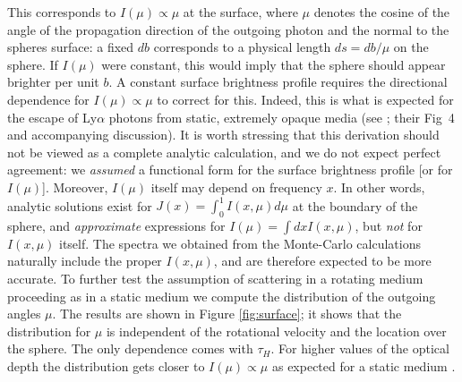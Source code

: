 This corresponds to $I(\mu) \propto \mu$ at the surface, where $\mu$
denotes the cosine of the angle of the propagation direction of the
outgoing photon and the normal to the spheres surface: a fixed $db$
corresponds to a physical length $ds = db/\mu$ on the sphere.
If $I(\mu)$ were constant, this would imply that the sphere should
appear brighter per unit $b$.
A constant surface brightness profile requires the directional
dependence for $I(\mu) \propto \mu$ to correct for this.
Indeed, this is what is expected for the escape of Ly$\alpha$ photons
from static, extremely opaque media (see \citet{Ahn01}; their
Fig~4 and accompanying discussion).
It is worth stressing that this derivation should not be viewed as a
complete analytic calculation, and we do not expect perfect agreement:
we {\it assumed} a functional form for the surface brightness profile
[or for $I(\mu)$]. Moreover, $I(\mu)$ itself may depend on frequency $x$. In other words, analytic solutions exist for $J(x) =
\int_0^1 I(x,\mu) d\mu$ at the boundary of the sphere, and {\it approximate}
expressions for $I(\mu) =\int dx I(x,\mu)$, but {\it not} for $I(x,\mu)$
itself. The spectra we obtained from the Monte-Carlo calculations naturally include the proper $I(x,\mu)$, and are therefore expected to be more accurate.
To further test the assumption of scattering in a rotating medium proceeding
as in a static medium we compute the distribution of the outgoing
angles $\mu$. The results are shown in Figure \ref{fig:surface}; it
shows that the distribution for $\mu$ is independent of the rotational
velocity and the location over the sphere. The only dependence comes
with $\tau_{H}$. For higher values of the optical depth the
distribution gets closer to $I(\mu)\propto \mu$ as expected for a
static medium \citep{Ahn01}.
%
